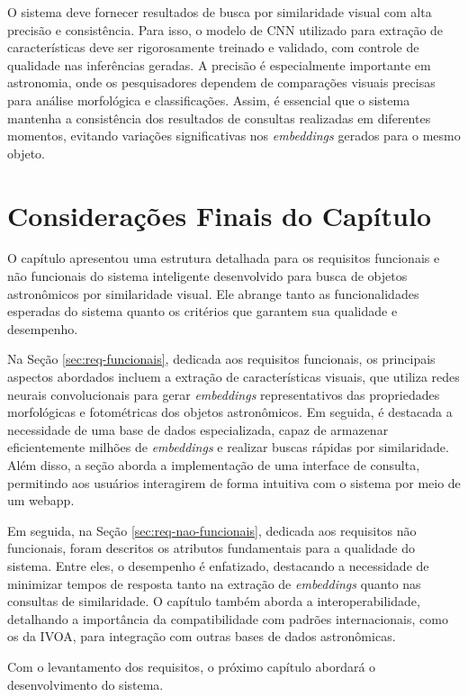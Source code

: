 O sistema deve fornecer resultados de busca por similaridade visual com alta precisão e consistência. Para isso, o modelo de CNN utilizado para extração de características deve ser rigorosamente treinado e validado, com controle de qualidade nas inferências geradas. A precisão é especialmente importante em astronomia, onde os pesquisadores dependem de comparações visuais precisas para análise morfológica e classificações. Assim, é essencial que o sistema mantenha a consistência dos resultados de consultas realizadas em diferentes momentos, evitando variações significativas nos \emph{embeddings} gerados para o mesmo objeto.



\section{Considerações Finais do Capítulo}
O capítulo apresentou uma estrutura detalhada para os requisitos funcionais e não funcionais do sistema inteligente desenvolvido para busca de objetos astronômicos por similaridade visual. Ele abrange tanto as funcionalidades esperadas do sistema quanto os critérios que garantem sua qualidade e desempenho.

Na Seção \ref{sec:req-funcionais}, dedicada aos requisitos funcionais, os principais aspectos abordados incluem a extração de características visuais, que utiliza redes neurais convolucionais para gerar \emph{embeddings} representativos das propriedades morfológicas e fotométricas dos objetos astronômicos. Em seguida, é destacada a necessidade de uma base de dados especializada, capaz de armazenar eficientemente milhões de \emph{embeddings} e realizar buscas rápidas por similaridade. Além disso, a seção aborda a implementação de uma interface de consulta, permitindo aos usuários interagirem de forma intuitiva com o sistema por meio de um webapp.

Em seguida, na Seção \ref{sec:req-nao-funcionais}, dedicada aos requisitos não funcionais, foram descritos os atributos fundamentais para a qualidade do sistema. Entre eles, o desempenho é enfatizado, destacando a necessidade de minimizar tempos de resposta tanto na extração de \emph{embeddings} quanto nas consultas de similaridade.  O capítulo também aborda a interoperabilidade, detalhando a importância da compatibilidade com padrões internacionais, como os da IVOA, para integração com outras bases de dados astronômicas.

Com o levantamento dos requisitos, o próximo capítulo abordará o desenvolvimento do sistema.

\chaptersep
